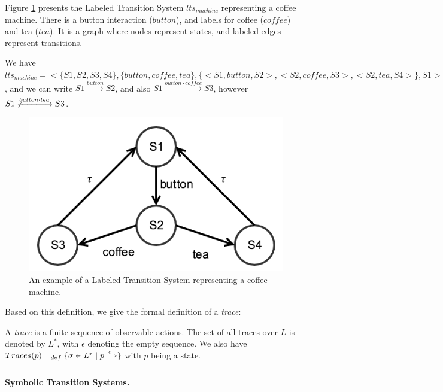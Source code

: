 \begin{example}
    Figure \ref{fig:lts-example} presents the Labeled Transition
    System $lts_{machine}$ representing a coffee machine. There
    is a button interaction ($button$), and labels for coffee
    ($coffee$) and tea ($tea$). It is a graph where nodes
    represent states, and labeled edges represent transitions.

    We have $lts_{machine} = <\{ S1, S2, S3, S4 \}, \{ button, coffee, tea
    \}, \{ <S1, button, S2>, <S2, coffee, S3>, <S2, tea, S4> \},
    S1>$, and we can write $S1 \xrightarrow[]{button} S2$, and
    also $S1 \xrightarrow[]{button \cdot coffee} S3$, however $S1
    \not\xrightarrow[]{button \cdot tea} S3$.

    \begin{figure}[ht]
        \begin{center}
            \includegraphics[width=0.7\linewidth]{figures/lts.png}
        \end{center}

        \caption{An example of a Labeled Transition System
        representing a coffee machine.}
        \label{fig:lts-example}
    \end{figure}
\end{example}

Based on this definition, we give the formal definition of a
\emph{trace}:

\begin{definition}[Trace]
    A \emph{trace} is a finite sequence of observable actions.
    The set of all traces over $L$ is denoted by $L^*$, with
    $\epsilon$ denoting the empty sequence.
    We also have $Traces(p) =_{def} \{ \sigma \in L^* \mid p
    \xRightarrow{\sigma} \}$ with $p$ being a state.
\end{definition}

\paragraph{Symbolic Transition Systems.}
\label{sec:definitions:sts}


